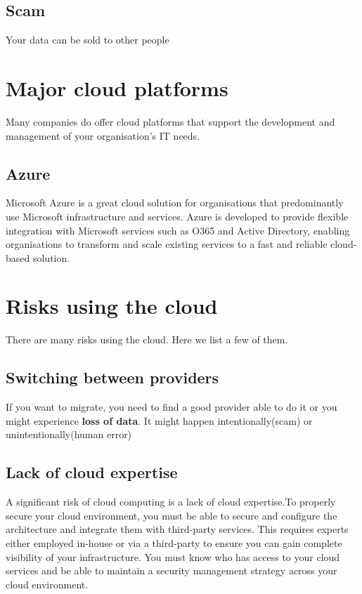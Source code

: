\documentclass[a4paper,12pt]{book}
\begin{document}
\subsection{Scam}
Your data can be sold to other people



\section{Major cloud platforms}
Many companies do offer cloud platforms that support the development and management of your organisation’s IT needs.
\subsection{Azure}
Microsoft Azure is a great cloud solution for organisations that predominantly use Microsoft infrastructure and services. Azure is developed to provide flexible integration with Microsoft services such as O365 and Active Directory, enabling organisations to transform and scale existing services to a fast and reliable cloud-based solution.

\clearpage
\section{Risks using the cloud}

There are many risks using the cloud. Here we list a few of them.

\subsection{Switching between providers} \flushleft
If you want to migrate, you need to find a good provider able to do it or you might experience \textbf{loss of data}. It might happen intentionally(scam) or unintentionally(human error)


\subsection{Lack of cloud expertise}

A significant risk of cloud computing is a lack of cloud expertise.To properly secure your cloud environment, you must be able to  secure and configure the architecture and integrate them with third-party services. This requires experts either employed in-house or via a third-party to ensure you can gain complete visibility of your infrastructure. You must know who has access to your cloud services and be able to maintain a security management strategy across your cloud environment.
\end{document}
